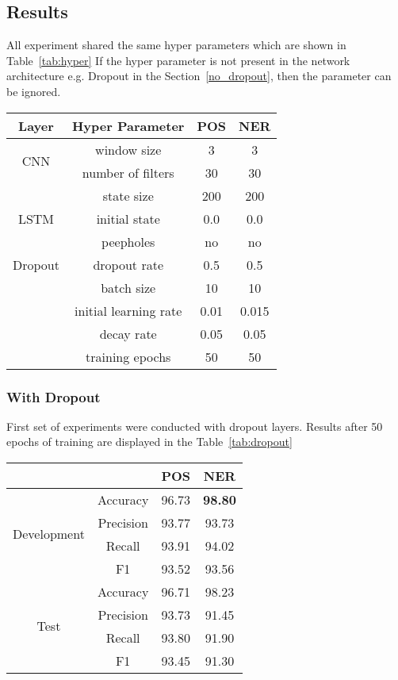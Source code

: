 \subsection{Results}
All experiment shared the same hyper parameters which are shown in Table~\ref{tab:hyper}
If the hyper parameter is not present in the network
architecture e.g. Dropout in the Section~\ref{no_dropout}, then the parameter
can be ignored.

\begin{center}
\begin{tabular}{|c|c|c|c|}
\hline
\textbf{Layer} & \textbf{Hyper Parameter} & \textbf{POS} & \textbf{NER} \\ \hline
\multirow{2}{*}{CNN} & window size & 3 & 3 \\
 & number of filters & 30 & 30 \\ \hline
\multirow{3}{*}{LSTM} & state size & 200 & 200 \\
 & initial state & 0.0 & 0.0 \\
 & peepholes & no & no \\ \hline
Dropout & dropout rate & 0.5 & 0.5 \\ \hline
\multirow{2}{*}{} & batch size & 10 & 10\\
 & initial learning rate & 0.01 & 0.015 \\
 & decay rate & 0.05 & 0.05 \\
 & training epochs & 50 & 50 \\
\hline
\end{tabular}
\label{tab:hyper}
\end{center}

\label{no_dropout}
\subsubsection{With Dropout}
First set of experiments were conducted with dropout layers. Results after 50
epochs of training are displayed in the Table~\ref{tab:dropout}

\begin{center}
\begin{tabular}{ |c|c|c|c| }
\hline
&  & {\textbf{POS}} & {\textbf{NER}}\\ \hline
\multirow{4}{*}{Development} & Accuracy & 96.73 & \textbf{98.80} \\
 & Precision & 93.77 & 93.73 \\
 & Recall & 93.91 & 94.02 \\
 & F1 & 93.52 & 93.56 \\ \hline
\multirow{4}{*}{Test} & Accuracy & 96.71 & 98.23 \\
 & Precision & 93.73 & 91.45 \\
 & Recall & 93.80 & 91.90 \\
 & F1 & 93.45 & 91.30 \\ \hline
\end{tabular}
\label{tab:dropout}
\end{center}


